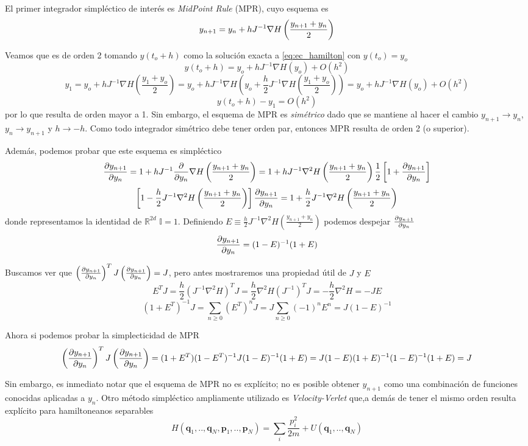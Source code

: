 El primer integrador simpléctico de interés es \textit{MidPoint Rule} (MPR), cuyo esquema es 
\begin{equation}{\label{eq:MPR}}
 y_{n+1} = y_n + hJ^{-1}\nabla H\left(\frac{y_{n+1}+y_n}{2}\right)
\end{equation}
 
Veamos que es de orden 2 tomando $y(t_o+h)$ como la solución exacta a \eqref{eq:ec_hamilton} con $y(t_o)=y_o$
\[ y(t_o+h) = y_o + hJ^{-1}\nabla H(y_o) + O(h^2) \]
\[ y_1 = y_o + hJ^{-1}\nabla H\left(\frac{y_1+y_o}{2}\right) =  y_o + hJ^{-1}\nabla H\left(y_o + \frac{h}{2}J^{-1}\nabla H\left(\frac{y_1+y_o}{2}\right)\right) = y_o + hJ^{-1}\nabla H(y_o) + O(h^2) \]
\[ y(t_o+h) - y_1 = O(h^2) \]
por lo que resulta de orden mayor a 1. 
Sin embargo, el esquema de MPR es \textit{simétrico} dado que se mantiene al hacer el cambio $y_{n+1}\to y_n$, $y_n\to y_{n+1}$ y $h\to -h$.
Como todo integrador simétrico debe tener orden par, entonces MPR resulta de orden 2 (o superior).

Además, podemos probar que este esquema es simpléctico
\[ \frac{\partial y_{n+1}}{\partial y_n} = 1 + hJ^{-1}\frac{\partial}{\partial y_n} \nabla H\left(\frac{y_{n+1}+y_n}{2}\right) = 1 + hJ^{-1} \nabla^2H\left(\frac{y_{n+1}+y_n}{2}\right)\frac{1}{2}\left[ 1+\frac{\partial y_{n+1}}{\partial y_n} \right]\]
\[ \left[ 1 - \frac{h}{2}J^{-1} \nabla^2H\left(\frac{y_{n+1}+y_n}{2}\right) \right]\frac{\partial y_{n+1}}{\partial y_n} =  1 + \frac{h}{2}J^{-1} \nabla^2H\left(\frac{y_{n+1}+y_n}{2}\right)\]
donde representamos la identidad de $\mathbb{R}^{2d}$ $\mathbb{I}=1$. 
Definiendo $E\equiv\frac{h}{2}J^{-1} \nabla^2H\left(\frac{y_{n+1}+y_n}{2}\right)$ podemos despejar $\frac{\partial y_{n+1}}{\partial y_n}$ 
\[ \frac{\partial y_{n+1}}{\partial y_n} = (1-E)^{-1}(1+E) \]

Buscamos ver que $\left(\frac{\partial y_{n+1}}{\partial y_n}\right)^TJ\left(\frac{\partial y_{n+1}}{\partial y_n}\right)= J$, pero antes mostraremos una propiedad útil de $J$ y $E$
\[ E^T J = \frac{h}{2}\left( J^{-1} \nabla^2H \right)^T J = \frac{h}{2} \nabla^2H(J^{-1})^T  J = -\frac{h}{2} \nabla^2H = -JE\]
\[ (1 + E^T)^{-1}J = \sum_{n\geq0} \left(E^T\right)^n J = J\sum_{n\geq0} (-1)^nE^n = J(1 - E)^{-1}  \]

Ahora si podemos probar la simplecticidad de MPR
\[ \left(\frac{\partial y_{n+1}}{\partial y_n}\right)^TJ\left(\frac{\partial y_{n+1}}{\partial y_n}\right) = (1+E^T)(1-E^T)^{-1}J(1-E)^{-1}(1+E) = J(1-E)(1+E)^{-1}(1-E)^{-1}(1+E) = J\]

Sin embargo, es inmediato notar que el esquema de MPR no es explícito; no es posible obtener $y_{n+1}$ como una combinación de funciones conocidas aplicadas a $y_n$.
Otro método simpléctico ampliamente utilizado es \textit{Velocity-Verlet} que,a demás de tener el mismo orden resulta explícito para hamiltoneanos separables
\[ H(\mathbf{q}_1,..,\mathbf{q}_N,\mathbf{p}_1,..,\mathbf{p}_N) = \sum_i \frac{p_i^2}{2m} + U(\mathbf{q}_1,..,\mathbf{q}_N)\]

